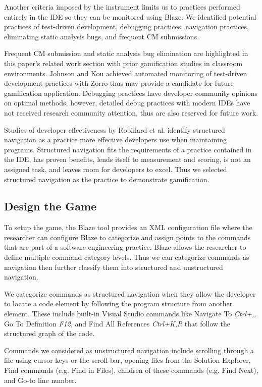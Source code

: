 \documentclass{sig-alternate}
\begin{document}
Another criteria imposed by the instrument limits us to practices performed entirely in the IDE so they can be monitored using Blaze.  We identified potential practices of test-driven development, debugging practices, navigation practices,  eliminating static analysis bugs, and frequent CM submissions.  

Frequent CM submission and static analysis bug elimination are highlighted in this paper's related work section with prior gamification studies in classroom environments.  Johnson and Kou achieved automated monitoring of test-driven development practices with Zorro \cite{V:Johnson2007Automated} thus may provide a candidate for future gamification application.   
Debugging practices have developer community opinions on optimal methods, however, detailed debug practices with modern IDEs have not received research community attention, thus are also reserved for future work.  

Studies of developer effectiveness by Robillard et al.\cite{wbsnipes:Robillard2004How} identify structured navigation as a practice more effective developers use when maintaining programs.   Structured navigation fits the requirements of a practice contained in the IDE, has proven benefits, lends itself to measurement and scoring, is not an assigned task, and leaves room for developers to excel.  Thus we selected structured navigation as the practice to demonstrate gamification.

\subsection{Design the Game}

To setup the game, the Blaze tool provides an XML configuration file where the researcher can configure Blaze to categorize and assign points to the commands that are part of a software engineering practice.  Blaze allows the researcher to define multiple command category levels.  Thus we can categorize commands as navigation then further classify them into structured and unstructured navigation.  

We categorize commands as structured navigation when they allow the developer to locate a code element by following the program structure from another element.  These include  built-in Visual Studio commands like Navigate To \textit{Ctrl+,}, Go To Definition \textit{F12}, and Find All References \textit{Ctrl+K,R}  that follow the structured graph of the code.

Commands we considered as unstructured navigation include scrolling through a file using cursor keys or the scroll-bar, opening files from the Solution Explorer, Find commands (e.g. Find in Files), children of these commands (e.g. Find Next), and Go-to line number.
\end{document}
